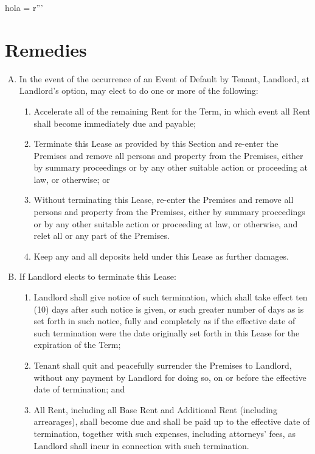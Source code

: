 hola = r'''\documentclass{article}
\begin{document}
\section{Remedies}
    \begin{enumerate}[(A)]
    \item
    In the event of the occurrence of an Event of Default by Tenant, Landlord, at Landlord's option, may elect to do one or more of the following:
    \begin{enumerate}[I]
    \item Accelerate all of the remaining Rent for the Term, in which event all Rent shall become immediately due and payable;

    \item Terminate this Lease as provided by this Section and re-enter the Premises and remove all persons and property from the Premises, either by summary proceedings or by any other suitable action or proceeding at law, or otherwise; or

    \item Without terminating this Lease, re-enter the Premises and remove all persons and property from the Premises, either by summary proceedings or by any other suitable action or proceeding at law, or otherwise, and relet all or any part of the Premises.

    \item  Keep any and all deposits held under this Lease as further damages.
    \end{enumerate}
    \item If Landlord elects to terminate this Lease:
    \begin{enumerate}[I]
    \item Landlord shall give notice of such termination, which shall take effect ten (10) days after such notice is given, or such greater number of days as is set forth in such notice, fully and completely as if the effective date of such termination were the date originally set forth in this Lease for the expiration of the Term;

    \item Tenant shall quit and peacefully surrender the Premises to Landlord, without any payment by Landlord for doing so, on or before the effective date of termination; and

    \item All Rent, including all Base Rent and Additional Rent (including arrearages), shall become due and shall be paid up to the effective date of termination, together with such expenses, including attorneys' fees, as Landlord shall incur in connection with such termination.
    \end{enumerate}
    

\end{enumerate}
\end{document}
